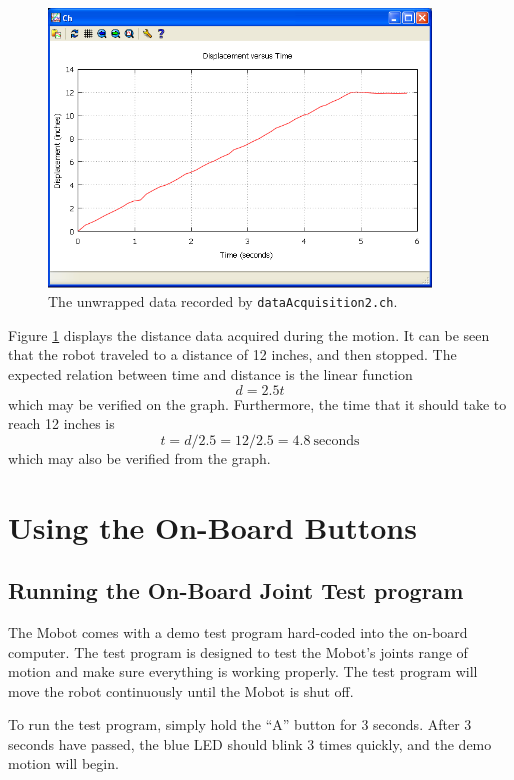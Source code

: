 \documentclass{article}
\begin{document}
\begin{figure}[H]
\centering
\includegraphics[width=4in]{images/dataacq3_plot1.png}
\caption{\label{fig:dataacq3_fig1} The unwrapped data recorded by \texttt{dataAcquisition2.ch}.}
\end{figure}

Figure \ref{fig:dataacq3_fig1} displays the distance data acquired during the motion. It can
be seen that the robot traveled to a distance of 12 inches, and then stopped. The
expected relation between time and distance is the linear function 
\begin{equation*}
d = 2.5t
\end{equation*}
which may be verified on the graph. Furthermore, the time that it should take to reach 
12 inches is 
\begin{equation}
t = d / 2.5 = 12 / 2.5 = 4.8 ~\text{seconds}
\end{equation}
which may also be verified from the graph.

\section{Using the On-Board Buttons}
\subsection{Running the On-Board Joint Test program}
The Mobot comes with a demo test program hard-coded into the on-board
computer. The test program is designed to test the Mobot's joints range of 
motion and make sure everything is working properly. The test program will
move the robot continuously until the Mobot is shut off.

To run the test program, simply hold the ``A'' button for 3 seconds. After
3 seconds have passed, the blue LED should blink 3 times quickly, and the
demo motion will begin.
\end{document}
